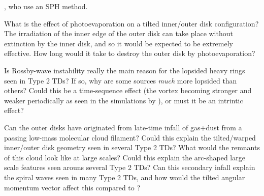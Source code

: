 \documentclass[10pt,fleqn,twoside]{article}
\begin{document}
\begin{compactenumerate}
  \citet{2017MNRAS.464.1449R}, who use an SPH method.
\item What is the effect of photoevaporation on a tilted inner/outer disk
  configuration? The irradiation of the inner edge of the outer disk can
  take place without extinction by the inner disk, and so it would be
  expected to be extremely effective. How long would it take to destroy
  the outer disk by photoevaporation?
\item Is Rossby-wave instability really the main reason for the lopsided
  heavy rings seen in Type 2 TDs? If so, why are some sources {\em much}
  more lopsided than others? Could this be a time-sequence effect (the
  vortex becoming stronger and weaker periodically as seen in the
  simulations by \citet{2012MNRAS.419.1701R}), or must it be an intrintic
  effect?
\item Can the outer disks have originated from late-time infall of gas+dust
  from a passing low-mass molecular cloud filament? Could this explain the
  tilted/warped inner/outer disk geometry seen in several Type 2 TDs? What
  would the remnants of this cloud look like at large scales? Could this
  explain the arc-shaped large scale features seen arouns several Type 2
  TDs? Can this secondary infall explain the spiral waves seen in many
  Type 2 TDs, and how would the tilted angular momentum vector 
  affect this compared to \citet{2015A&A...582L...9L}?
\end{compactenumerate}
\end{document}

